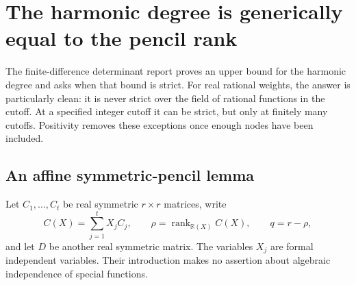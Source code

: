 \section{The harmonic degree is generically equal to the pencil rank}
\label{deg:sec}

The finite-difference determinant report proves an upper bound for the
harmonic degree and asks when that bound is strict.  For real rational
weights, the answer is particularly clean: it is never strict over the
field of rational functions in the cutoff.  At a specified integer
cutoff it can be strict, but only at finitely many cutoffs.  Positivity
removes these exceptions once enough nodes have been included.

\subsection{An affine symmetric-pencil lemma}

Let $C_1,\ldots,C_t$ be real symmetric $r\times r$ matrices, write
\[
 C(X)=\sum_{j=1}^tX_jC_j,
 \qquad \rho=\operatorname{rank}_{\mathbb R(X)} C(X),
 \qquad q=r-\rho,
\]
and let $D$ be another real symmetric matrix.  The variables $X_j$ are
formal independent variables.  Their introduction makes no assertion
about algebraic independence of special functions.

